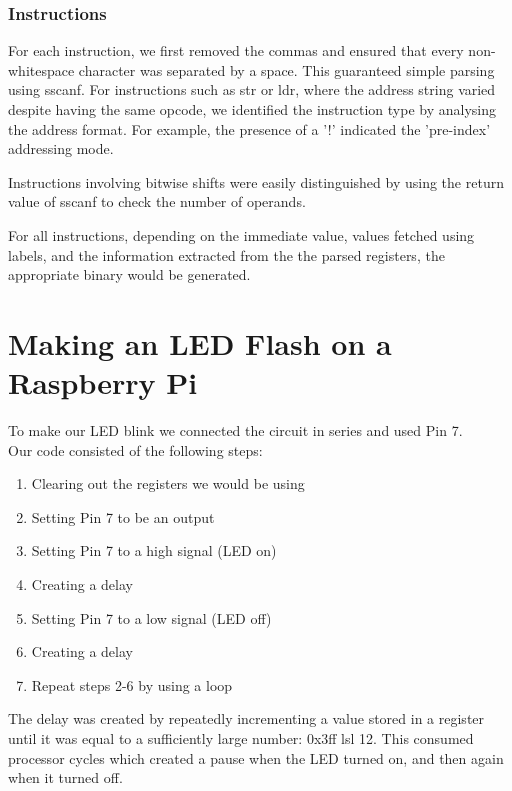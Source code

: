 \documentclass{article}
\begin{document}
\subsubsection{Instructions}

For each instruction, we first removed the commas and ensured that every non-whitespace character was separated by a space. This guaranteed simple parsing using sscanf. For instructions such as str or ldr, where the address string varied despite having the same opcode, we identified the instruction type by analysing the address format. For example, the presence of a '!' indicated the 'pre-index' addressing mode.

Instructions involving bitwise shifts were easily distinguished by using the return value of sscanf to check the number of operands.

For all instructions, depending on the immediate value, values fetched using labels, and the information extracted from the the parsed registers, the appropriate binary would be generated.\\

\section{Making an LED Flash on a Raspberry Pi}

To make our LED blink we connected the circuit in series and used Pin 7.\\

Our code consisted of the following steps:
\begin{enumerate} [noitemsep]
    \item Clearing out the registers we would be using
    \item Setting Pin 7 to be an output
    \item Setting Pin 7 to a high signal (LED on)
    \item Creating a delay
    \item Setting Pin 7 to a low signal (LED off)
    \item Creating a delay
    \item Repeat steps 2-6 by using a loop
\end{enumerate}

The delay was created by repeatedly incrementing a value stored in a register until it was equal to a sufficiently large number: 0x3ff lsl 12. This consumed processor cycles which created a pause when the LED turned on, and then again when it turned off. \\
\end{document}
